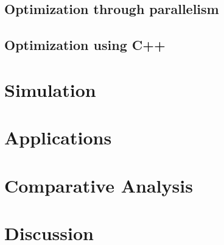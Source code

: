 \documentclass{article}
\begin{document}
\subsection{Optimization through parallelism}

\subsection{Optimization using C++}

\section{Simulation}

\section{Applications}

\section{Comparative Analysis}

\section{Discussion}



\end{document}
